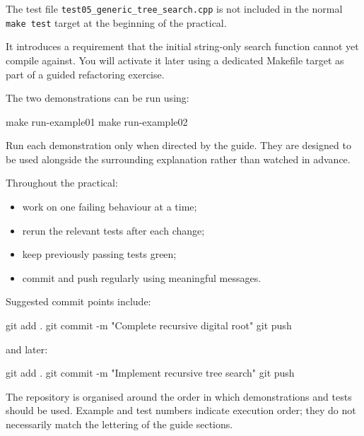 \documentclass{csc2059practical}
\begin{document}
\begin{importantnote}
The test file \texttt{test05_generic_tree_search.cpp} is not included
in the normal \texttt{make test} target at the beginning of the
practical.

It introduces a requirement that the initial string-only search function cannot
yet compile against. You will activate it later using a dedicated Makefile
target as part of a guided refactoring exercise.
\end{importantnote}

The two demonstrations can be run using:

\begin{terminal}
make run-example01
make run-example02
\end{terminal}

Run each demonstration only when directed by the guide. They are designed to be
used alongside the surrounding explanation rather than watched in advance.

Throughout the practical:

\begin{itemize}
    \item work on one failing behaviour at a time;
    \item rerun the relevant tests after each change;
    \item keep previously passing tests green;
    \item commit and push regularly using meaningful messages.
\end{itemize}

Suggested commit points include:

\begin{terminal}
git add .
git commit -m "Complete recursive digital root"
git push
\end{terminal}

and later:

\begin{terminal}
git add .
git commit -m "Implement recursive tree search"
git push
\end{terminal}



The repository is organised around the order in which demonstrations and tests
should be used. Example and test numbers indicate execution order; they do not
necessarily match the lettering of the guide sections.
\end{document}
